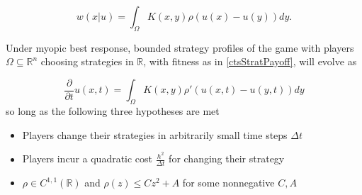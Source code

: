 \documentclass[10pt,a4paper]{amsart}
\begin{document}
\begin{equation}\label{ctsStratPayoff}
w(x|u)=\int_{\Omega}K(x,y)\rho(u(x)-u(y))dy.
\end{equation}

    \begin{proposition}\label{PROP:ModelWellFounded}
        Under myopic best response, bounded strategy profiles of the game with players $\Omega\subseteq \mathbb{R}^n$ choosing strategies in $\mathbb{R}$, with fitness as in \eqref{ctsStratPayoff}, will evolve as
       
       \[\frac{\partial}{\partial t}u(x,t)=\int_{\Omega}K(x,y)\rho'(u(x,t)-u(y,t))dy\]
        so long as the following three hypotheses are met
        \begin{itemize}
            \item[(H1)] Players change their strategies in arbitrarily small time steps $\Delta t$
            \item[(H2)] Players incur a quadratic cost $\frac{h^2}{\Delta t}$ for changing their strategy
            \item[(H3)] $\rho\in C^{1,1}(\mathbb{R})$ and $\rho(z)\leq Cz^2+A$ for some nonnegative $C,A$
        \end{itemize}
    \end{proposition}
\end{document}
